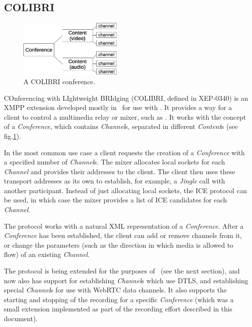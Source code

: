 \documentclass[twoside,openright,a4paper,12pt,english]{article}
\begin{document}
\subsection{COLIBRI}
\begin{figure}[h]
   \centering
        \includegraphics[width=0.45\textwidth]{./pics/colibri-conf.eps}

        \caption{A COLIBRI conference.}
   \label{colibri-conf}
\end{figure}


COnferencing with LIghtweight BRIdging (COLIBRI, defined in XEP-0340\cite{colibri}) is an XMPP extension
developed mostly in \bj\ for use with \jvb. It provides a way for a client to control a multimedia
relay or mixer, such as \jvb. It works with the concept of a \emph{Conference}, which contains
\emph{Channel}s, separated in different \emph{Content}s (see fig.\ref{colibri-conf}).

In the most common use case a client requests the creation of a \emph{Conference} with a specified number of
\emph{Channel}s. The mixer allocates local sockets for each \emph{Channel} and
provides their addresses to the client. The client then uses these transport
addresses as its own to establish, for example, a \emph{Jingle} call with another participant. 
Instead of just allocating local sockets, the ICE protocol can be used, in
which case the mixer provides a list of ICE candidates for each \emph{Channel}.

The protocol works with a natural XML representation of a \emph{Conference}.
After a \emph{Conference} has been established, the client can add or remove channels
from it, or change the parameters (such as the direction in which
media is allowed to flow) of an existing \emph{Channel}.

The protocol is being extended for the purposes of \jm\ (see the next section), and
now also has support for establishing \emph{Channel}s which use DTLS\cite{dtls}, and
establishing special \emph{Channel}s for use with WebRTC data channels. It also supports the
starting and stopping of the recording for a specific \emph{Conference} (which was a
small extension implemented as part of the recording effort described in this document). 
\end{document}
